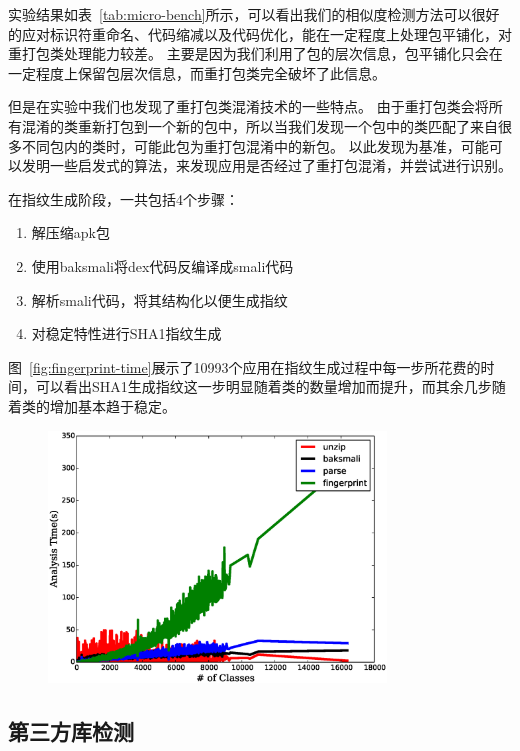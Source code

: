 实验结果如表~\ref{tab:micro-bench}所示，可以看出我们的相似度检测方法可以很好的应对标识符重命名、代码缩减以及代码优化，能在一定程度上处理包平铺化，对重打包类处理能力较差。
主要是因为我们利用了包的层次信息，包平铺化只会在一定程度上保留包层次信息，而重打包类完全破坏了此信息。

但是在实验中我们也发现了重打包类混淆技术的一些特点。
由于重打包类会将所有混淆的类重新打包到一个新的包中，所以当我们发现一个包中的类匹配了来自很多不同包内的类时，可能此包为重打包混淆中的新包。
以此发现为基准，可能可以发明一些启发式的算法，来发现应用是否经过了重打包混淆，并尝试进行识别。

在指纹生成阶段，一共包括4个步骤：
\begin{enumerate}
	\item 解压缩apk包
	\item 使用baksmali将dex代码反编译成smali代码
	\item 解析smali代码，将其结构化以便生成指纹
	\item 对稳定特性进行SHA1指纹生成
\end{enumerate}

图~\ref{fig:fingerprint-time}展示了10993个应用在指纹生成过程中每一步所花费的时间，可以看出SHA1生成指纹这一步明显随着类的数量增加而提升，而其余几步随着类的增加基本趋于稳定。

\begin{figure}
	\centering
	\includegraphics[width=0.8\textwidth]{figure/time-cdf.eps}
\end{figure}

\subsection{第三方库检测}

